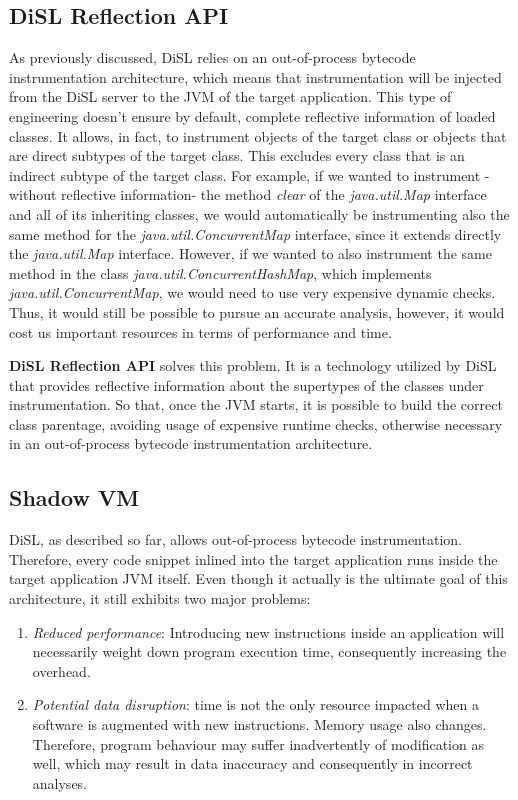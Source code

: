 \documentclass[]{usiinfthesis}
\begin{document}
\subsection{DiSL Reflection API}
As previously discussed, DiSL relies on an out-of-process bytecode instrumentation architecture, which means that instrumentation will be injected from the DiSL server to the JVM of the target application. This type of engineering doesn't ensure by default, complete reflective information of loaded classes. It allows, in fact, to instrument objects of the target class or objects that are direct subtypes of the target class. This excludes every class that is an indirect subtype of the target class. For example, if we wanted to instrument -without reflective information- the method \textit{clear} of the \textit{java.util.Map} interface and all of its inheriting classes, we would automatically be instrumenting also the same method for the \textit{java.util.ConcurrentMap} interface, since it extends directly the \textit{java.util.Map} interface. However, if we wanted to also instrument the same method in the class \textit{java.util.ConcurrentHashMap}, which implements \textit{java.util.ConcurrentMap}, we would need to use very expensive dynamic checks. Thus, it would still be possible to pursue an accurate analysis, however, it would cost us important resources in terms of performance and time.

\textbf{DiSL Reflection API} \cite{DiSLReflectionAPI} solves this problem. It is a technology utilized by DiSL that provides reflective information about the supertypes of the classes under instrumentation. So that, once the JVM starts, it is possible to build the correct class parentage, avoiding usage of expensive runtime checks, otherwise necessary in an out-of-process bytecode instrumentation architecture.

\subsection{Shadow VM}

DiSL, as described so far, allows out-of-process bytecode instrumentation. Therefore, every code snippet inlined into the target application runs inside the target application JVM itself. Even though it actually is the ultimate goal of this architecture, it still exhibits two major problems:
\begin{enumerate}
    \item \textit{Reduced performance}: Introducing new instructions inside an application will necessarily weight down program execution time, consequently increasing the overhead.
    \item \textit{Potential data disruption}: time is not the only resource impacted when a software is augmented with new instructions. Memory usage also changes. Therefore, program behaviour may suffer inadvertently of modification as well, which may result in data inaccuracy and consequently in incorrect analyses.
\end{enumerate}
\end{document}

